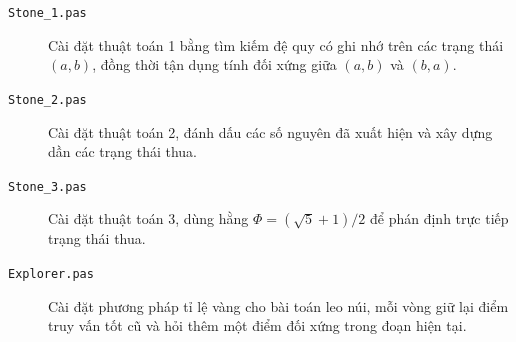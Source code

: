 \documentclass[11pt]{article}
\begin{document}
\begin{description}
  \item[\texttt{Stone\_1.pas}] Cài đặt thuật toán 1 bằng tìm kiếm đệ quy có
  ghi nhớ trên các trạng thái \((a,b)\), đồng thời tận dụng tính đối xứng
  giữa \((a,b)\) và \((b,a)\).
  \item[\texttt{Stone\_2.pas}] Cài đặt thuật toán 2, đánh dấu các số nguyên
  đã xuất hiện và xây dựng dần các trạng thái thua.
  \item[\texttt{Stone\_3.pas}] Cài đặt thuật toán 3, dùng hằng
  \(\Phi=(\sqrt{5}+1)/2\) để phán định trực tiếp trạng thái thua.
  \item[\texttt{Explorer.pas}] Cài đặt phương pháp tỉ lệ vàng cho bài toán
  leo núi, mỗi vòng giữ lại điểm truy vấn tốt cũ và hỏi thêm một điểm đối
  xứng trong đoạn hiện tại.
\end{description}
\end{document}
